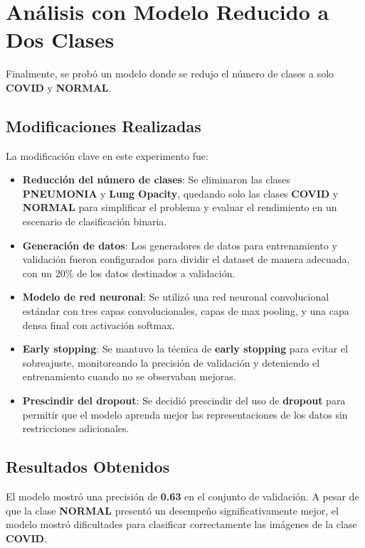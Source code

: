 \documentclass{article}
\begin{document}
	
	\section{Análisis con Modelo Reducido a Dos Clases}
	
	Finalmente, se probó un modelo donde se redujo el número de clases a solo \textbf{COVID} y \textbf{NORMAL}. 
	
	\subsection{Modificaciones Realizadas}
	
	La modificación clave en este experimento fue:
	
	\begin{itemize}
		\item \textbf{Reducción del número de clases}: Se eliminaron las clases \textbf{PNEUMONIA} y \textbf{Lung Opacity}, quedando solo las clases \textbf{COVID} y \textbf{NORMAL} para simplificar el problema y evaluar el rendimiento en un escenario de clasificación binaria.
		\item \textbf{Generación de datos}: Los generadores de datos para entrenamiento y validación fueron configurados para dividir el dataset de manera adecuada, con un 20\% de los datos destinados a validación.
		\item \textbf{Modelo de red neuronal}: Se utilizó una red neuronal convolucional estándar con tres capas convolucionales, capas de max pooling, y una capa densa final con activación softmax.
		\item \textbf{Early stopping}: Se mantuvo la técnica de \textbf{early stopping} para evitar el sobreajuste, monitoreando la precisión de validación y deteniendo el entrenamiento cuando no se observaban mejoras.
		\item \textbf{Prescindir del dropout}: Se decidió prescindir del uso de \textbf{dropout} para permitir que el modelo aprenda mejor las representaciones de los datos sin restricciones adicionales.
	\end{itemize}
	
	
	
	\subsection{Resultados Obtenidos}
	
	El modelo mostró una precisión de \textbf{0.63} en el conjunto de validación. A pesar de que la clase \textbf{NORMAL} presentó un desempeño significativamente mejor, el modelo mostró dificultades para clasificar correctamente las imágenes de la clase \textbf{COVID}.
	
\end{document}
